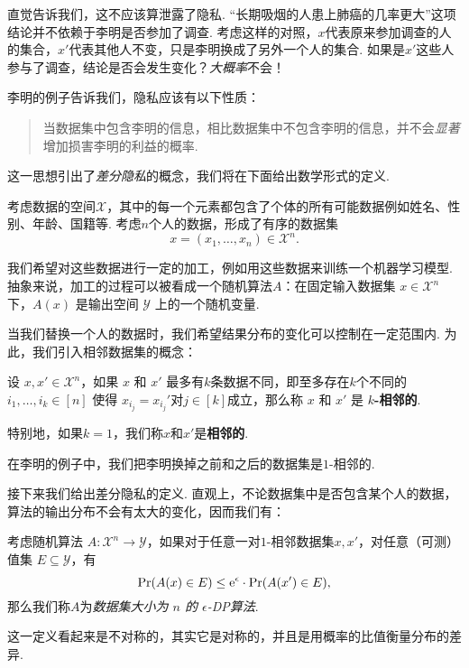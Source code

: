 直觉告诉我们，这不应该算泄露了隐私. “长期吸烟的人患上肺癌的几率更大”这项结论并不依赖于李明是否参加了调查. 考虑这样的对照，$x$代表原来参加调查的人的集合，$x'$代表其他人不变，只是李明换成了另外一个人的集合. 如果是$x'$这些人参与了调查，结论是否会发生变化？\textit{大概率}不会！

李明的例子告诉我们，隐私应该有以下性质：
\begin{quotation}
    当数据集中包含李明的信息，相比数据集中不包含李明的信息，并不会\textit{显著}增加损害李明的利益的概率.
\end{quotation}
这一思想引出了\textit{差分隐私}的概念，我们将在下面给出数学形式的定义.

考虑数据的空间$\mathcal X$，其中的每一个元素都包含了个体的所有可能数据例如姓名、性别、年龄、国籍等. 考虑$n$个人的数据，形成了有序的数据集
\[x = (x_1, \dots, x_n) \in \mathcal X^n.\]  

我们希望对这些数据进行一定的加工，例如用这些数据来训练一个机器学习模型. 抽象来说，加工的过程可以被看成一个随机算法$A$：在固定输入数据集 $x \in \mathcal X^n$下，$A(x)$ 是输出空间 $\mathcal Y$ 上的一个随机变量. 

当我们替换一个人的数据时，我们希望结果分布的变化可以控制在一定范围内. 为此，我们引入相邻数据集的概念：

\begin{definition}[$k$-相邻数据集]
    设 $x, x' \in \mathcal X^n$，如果 $x$ 和 $x'$ 最多有$k$条数据不同，即至多存在$k$个不同的$i_1,\dots,i_k \in [n]$ 使得 $x_{i_j}=x_{i_j}'$对$j\in[k]$成立，那么称 $x$ 和 $x'$ 是 \textbf{$k$-相邻的}. 
    
    特别地，如果$k=1$，我们称$x$和$x'$是\textbf{相邻的}.
\end{definition}

在李明的例子中，我们把李明换掉之前和之后的数据集是$1$-相邻的. 

接下来我们给出差分隐私的定义. 直观上，不论数据集中是否包含某个人的数据，算法的输出分布不会有太大的变化，因而我们有：

\begin{definition}
考虑随机算法 $A : \mathcal X^n \to \mathcal Y$，如果对于任意一对$1$-相邻数据集$x, x'$，对任意（可测）值集 $E \subseteq \mathcal Y$，有
\[
\Pr(A(x)\in E) \leq \mathrm{e}^{\epsilon} \cdot \Pr(A(x')\in E),
\]
那么我们称$A$为\textit{数据集大小为 $n$ 的 $\epsilon$-DP算法}.
\end{definition}

这一定义看起来是不对称的，其实它是对称的，并且是用概率的比值衡量分布的差异. 

